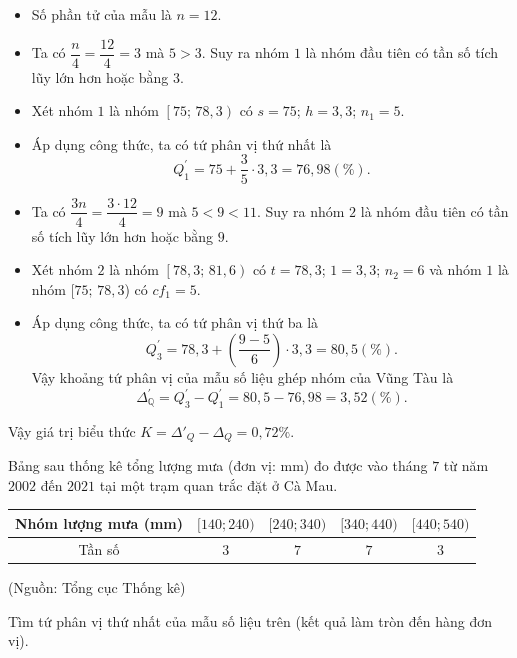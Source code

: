 \begin{ex}
{\begin{itemize}
\begin{itemize}
				\item Số phần tử của mẫu là $n=12$.
				\item Ta có $\dfrac{n}{4}=\dfrac{12}{4}=3$ mà $5> 3$. Suy ra nhóm $1$ là nhóm đầu tiên có tần số tích lũy lớn hơn hoặc bằng $3$.
				\item Xét nhóm $1$ là nhóm $\left[75;\,78{,}3\right)$ có $s=75$; $h=3{,}3$; $n_1=5$.
				\item Áp dụng công thức, ta có tứ phân vị thứ nhất là
				\[Q_1^{'}=75+\dfrac{3}{5} \cdot 3{,}3=76{,}98\left(\% \right).
				\]
				\item Ta có $\dfrac{3n}{4}=\dfrac{3\cdot 12}{4}=9$ mà $5< 9< 11$. Suy ra nhóm $2$ là nhóm đầu tiên có tần số tích lũy lớn hơn hoặc bằng $9$.
				\item Xét nhóm $2$ là nhóm $\left[78{,}3;\,81{,}6\right)$ có $t=78{,}3$; $1=3{,}3$; $n_2=6$ và nhóm $1$ là nhóm $[75;\,78{,}3$) có $cf_1=5$.
				\item Áp dụng công thức, ta có tứ phân vị thứ ba là
				\[Q_3^{'}=78{,}3+\left(\dfrac{9-5}{6} \right)\cdot 3,3=80{,}5\left(\% \right).
				\]
				Vậy khoảng tứ phân vị của mẫu số liệu ghép nhóm của Vũng Tàu là
				\[\Delta _{\mathbb{Q}}^{'}=Q_3^{'}-Q_1^{'}=80{,}5-76{,}98=3{,}52\left(\% \right).
				\]
			\end{itemize}	
			Vậy giá trị biểu thức $K=\Delta '_Q-\Delta_Q=0{,}72\%$.
		\end{itemize}
	}
\end{ex}

\begin{ex}%
	Bảng sau thống kê tổng lượng mưa (đơn vị: mm) đo được vào tháng $7$ từ năm $2002$ đến $2021$ tại một trạm quan trắc đặt ở Cà Mau.
	\begin{center}
		\begin{tabular}{|c|c|c|c|c|}
			\hline
			Nhóm lượng mưa (mm) & $[140;240)$ & $[240;340)$ & $[340;440)$ & $[440;540)$ \\
			\hline
			Tần số & $3$ & $7$ & $7$ & $3$ \\
			\hline
		\end{tabular}
	\end{center}
	\begin{flushright}
		(Nguồn: Tổng cục Thống kê)
	\end{flushright}
	Tìm tứ phân vị thứ nhất của mẫu số liệu trên (kết quả làm tròn đến hàng đơn vị).
\end{ex}

